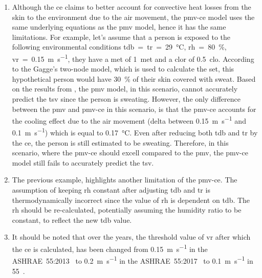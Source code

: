 \begin{enumerate}
    \item Although the \ac{ce} claims to better account for convective heat losses from the skin to the environment due to the air movement, the \ac{pmv-ce} model uses the same underlying equations as the \ac{pmv} model, hence it has the same limitations.
    For example, let's assume that a person is exposed to the following environmental conditions \ac{tdb}~=~\ac{tr}~=~\qty{29}{\celsius}, \ac{rh}~=~\qty{80}{\percent}, \ac{vr}~=~\qty{0.15}{\m\per\s}, they have a \ac{met} of \qty{1}{met} and a \ac{clor} of \qty{0.5}{clo}.
    According to the Gagge's two-node model, which is used to calculate the \ac{set}, this hypothetical person would have \qty{30}{\percent} of their skin covered with sweat.
    Based on the results from , the \ac{pmv} model, in this scenario, cannot accurately predict the \ac{tsv} since the person is sweating.
    However, the only difference between the \ac{pmv} and \ac{pmv-ce} in this scenario, is that the \ac{pmv-ce} accounts for the cooling effect due to the air movement (delta between \qty{0.15}{\m\per\s} and \qty{0.1}{\m\per\s}) which is equal to \qty{.17}{\celsius}.
    Even after reducing both \ac{tdb} and \ac{tr} by the \ac{ce}, the person is still estimated to be sweating.
    Therefore, in this scenario, where the \ac{pmv-ce} should excell compared to the \ac{pmv}, the \ac{pmv-ce} model still fails to accurately predict the \ac{tsv}.
    \item The previous example, highlights another limitation of the \ac{pmv-ce}.
    The assumption of keeping \ac{rh} constant after adjusting \ac{tdb} and \ac{tr} is thermodynamically incorrect since the value of \ac{rh} is dependent on \ac{tdb}.
    The \ac{rh} should be re-calculated, potentially assuming the humidity ratio to be constant, to reflect the new \ac{tdb} value.
    \item It should be noted that over the years, the threshold value of \ac{vr} after which the \ac{ce} is calculated, has been changed from \qty{0.15}{\m\per\s} in the ASHRAE~55:2013~\cite{ASHRAE552013} to \qty{0.2}{\m\per\s} in the ASHRAE~55:2017~\cite{ASHRAE552017, arens_moving_2009} to \qty{0.1}{\m\per\s} in \gls{55}~\cite{ashrae552023}.

\end{enumerate}
